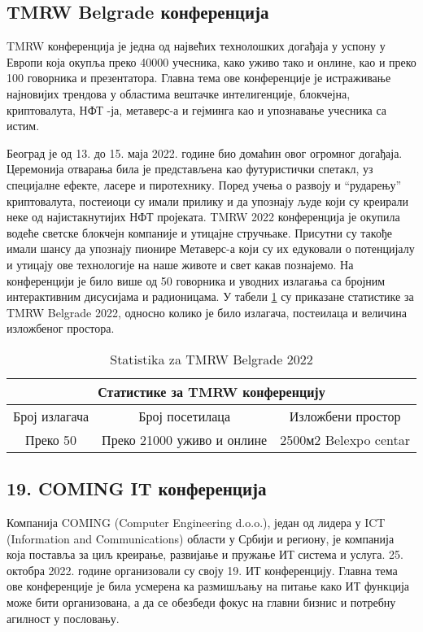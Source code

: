 \documentclass[12pt]{article}
\begin{document}
\subsection{TMRW Belgrade конференција}

TMRW конференција је једна од највећих технолошких догађаја у успону у Европи која окупља преко 40000 учесника, како уживо тако и онлине, као и преко 100 говорника и презентатора. Главна тема ове конференције је истраживање најновијих трендова у областима вештачке интелигенције, блокчејна, криптовалута, НФТ -ја, метаверс-а и гејминга као и упознавање учесника са истим.  

Београд је од 13. до 15. маја 2022. године био домаћин овог огромног догађаја. Церемонија отварања била је представљена као футуристички спетакл, уз специјалне ефекте, ласере и пиротехнику. Поред учења о развоју и “рударењу” криптовалута, постеиоци су имали прилику и да упознају људе који су креирали неке од најистакнутијих НФТ пројеката. TMRW 2022 конференција је окупила водеће светске блокчејн компаније и утицајне стручњаке. Присутни су такође имали шансу да упознају пионире Метаверс-а који су их едуковали о потенцијалу и утицају ове технологије на наше животе и свет какав познајемо. На конференцији је било више од 50 говорника и уводних излагања са бројним интерактивним дисусијама и радионицама. У табели \ref{tab:tabela2} су приказане статистике за TMRW Belgrade 2022, односно колико је било излагача, постеилаца и величина изложбеног простора.\cite{tmrw}

\begin{table}[h!]
\begin{center}
\begin{tabular}{|ccc|}
\hline
\multicolumn{3}{|c|}{Статистике за TMRW конференцију}                                                                  \\ \hline
\multicolumn{1}{|c|}{Број излагача} & \multicolumn{1}{c|}{Број посетилаца}          & Изложбени простор           \\ \hline
\multicolumn{1}{|c|}{Преко 50}      & \multicolumn{1}{c|}{Преко 21000 уживо и онлине} & 2500м2 Belexpo centar \\ \hline
\end{tabular}
\caption{Statistika za TMRW Belgrade 2022}
\label{tab:tabela2}
\end{center}
\end{table}
 
\subsection{19. COMING IT конференција}
Компанија COMING (Computer Engineering d.o.o.), један од лидера у ICT (Information and Communications) области у Србији и региону, је компанија која поставља за циљ креирање, развијање и пружање ИТ система и услуга. 25. октобра 2022. године организовали су своју 19. ИТ конференцију. Главна тема ове конференције је била усмерена ка размишљању на питање како ИТ функција може бити организована, а да се обезбеди фокус на главни бизнис и потребну агилност у пословању.\cite{comingit}
\end{document}
